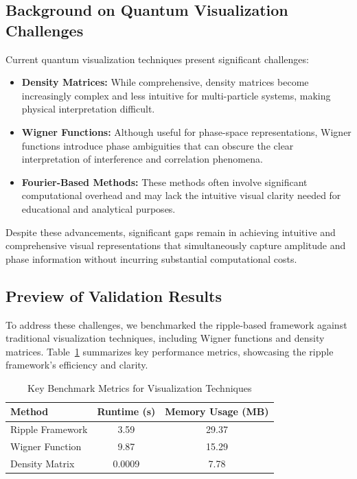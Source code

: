 \documentclass[12pt]{article}
\begin{document}
\subsection{Background on Quantum Visualization Challenges}
Current quantum visualization techniques present significant challenges:
\begin{itemize}
    \item \textbf{Density Matrices:} While comprehensive, density matrices become increasingly complex and less intuitive for multi-particle systems, making physical interpretation difficult.
    \item \textbf{Wigner Functions:} Although useful for phase-space representations, Wigner functions introduce phase ambiguities that can obscure the clear interpretation of interference and correlation phenomena.
    \item \textbf{Fourier-Based Methods:} These methods often involve significant computational overhead and may lack the intuitive visual clarity needed for educational and analytical purposes.
\end{itemize}

Despite these advancements, significant gaps remain in achieving intuitive and comprehensive visual representations that simultaneously capture amplitude and phase information without incurring substantial computational costs.

\subsection*{Preview of Validation Results}
To address these challenges, we benchmarked the ripple-based framework against traditional visualization techniques, including Wigner functions and density matrices. Table~\ref{tab:preview_results} summarizes key performance metrics, showcasing the ripple framework's efficiency and clarity.

\begin{table}[H]
\centering
\caption{Key Benchmark Metrics for Visualization Techniques}
\begin{tabular}{|l|c|c|}
    \hline
    \textbf{Method} & \textbf{Runtime (s)} & \textbf{Memory Usage (MB)} \\
    \hline
    Ripple Framework    & 3.59        & 29.37             \\
    Wigner Function     & 9.87        & 15.29             \\
    Density Matrix      & 0.0009      & 7.78              \\
    \hline
\end{tabular}
\label{tab:preview_results}
\end{table}
\end{document}
